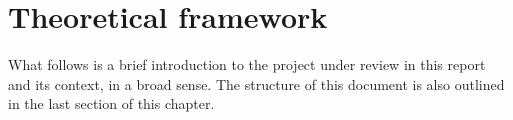 \chapter{Theoretical framework} %
\label{Chapter2TheoreticalFramework} %


What follows is a brief introduction to the project under review in this report and its context,
in a broad sense. The structure of this document is also outlined in the last section of this chapter.




